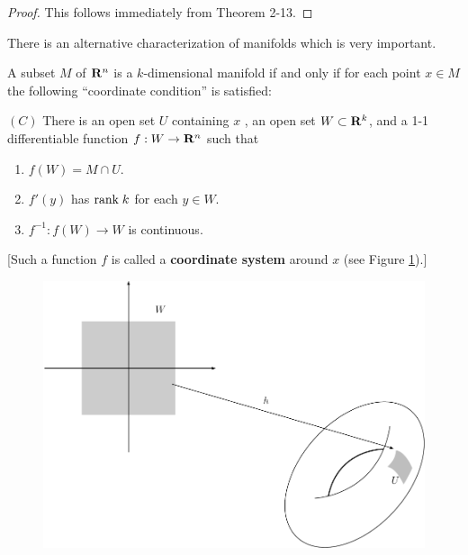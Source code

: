 \begin{proof}
    This follows immediately from Theorem 2-13. 
\end{proof}

There is an alternative characterization of manifolds which
is very important.

\begin{theorem}
    A subset $M$ of $\mathbf{R}^n$ is a $k$-dimensional manifold if and only if for 
    each point $x\in M$ the following ``coordinate condition'' is satisfied:
    
    \vspace*{1em}
    \noindent$(C)$ There is an open set $U$ containing $x$ , an open set $W\subset\mathbf{R}^k$,
    and a 1-1 differentiable function $f:W\to\mathbf{R}^n$ such that
    \begin{enumerate}[label=\upshape{(\arabic*)}]
        \item $f(W)=M\cap U$.
        \item $f'(y)$ has $\mathrm{rank}\; k$ for each $y\in W$.
        \item $f^{-1}:f(W)\to W$ is continuous.
    \end{enumerate}
\end{theorem}

[Such a function $f$ is called a \textbf{coordinate system} around $x$ (see Figure \ref{Fig 5-2}).]

\begin{figure}[!htb]
    \centering
    \includegraphics[width=.75\linewidth]{./pics/Fig5-2.pdf}
    \caption{}
    \label{Fig 5-2}
\end{figure}

